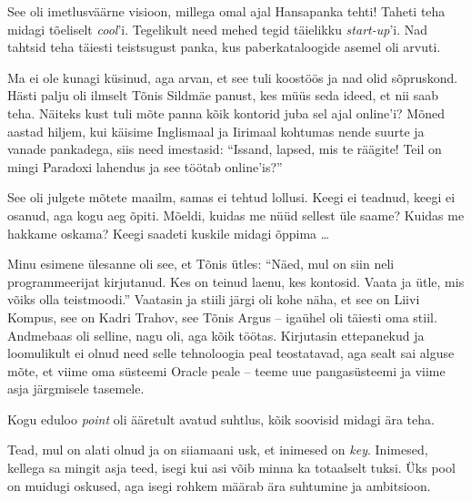 
See oli imetlusväärne visioon, millega omal ajal Hansapanka 
tehti! Taheti teha midagi tõeliselt \emph{cool}'i. Tegelikult need mehed tegid täielikku \emph{start-up}'i. 
Nad tahtsid teha täiesti teistsugust panka, kus paberkataloogide asemel oli 
arvuti. 


Ma ei ole kunagi küsinud, aga arvan, et see tuli koostöös ja nad olid sõpruskond. 
Hästi palju oli ilmselt Tõnis Sildmäe panust, kes
müüs seda ideed, et nii saab teha. Näiteks kust tuli mõte panna kõik kontorid juba sel ajal online'i? 
Mõned aastad hiljem, kui käisime Inglismaal ja Iirimaal kohtumas nende 
suurte ja vanade pankadega, siis need imestasid: \enquote{Issand, lapsed, mis 
te räägite! Teil on mingi Paradoxi lahendus ja see töötab online'is?}

See oli julgete mõtete maailm, samas ei tehtud 
lollusi. Keegi ei teadnud, keegi ei osanud, aga kogu aeg õpiti. Mõeldi, 
kuidas me nüüd sellest üle saame? Kuidas me hakkame oskama? Keegi saadeti
kuskile midagi õppima \dots 

Minu esimene ülesanne oli see, et 
Tõnis ütles: \enquote{Näed, mul on siin neli 
programmeerijat kirjutanud. Kes on teinud laenu, kes kontosid. Vaata 
ja ütle, mis võiks olla teistmoodi.} Vaatasin ja stiili 
järgi oli kohe näha, et see on Liivi Kompus, see on Kadri Trahov, see Tõnis 
Argus -- igaühel oli täiesti oma stiil. Andmebaas oli selline, nagu oli, aga kõik
töötas. Kirjutasin ettepanekud ja loomulikult ei olnud need 
selle tehnoloogia peal teostatavad, aga sealt sai alguse mõte, et viime oma 
süsteemi Oracle peale -- teeme uue pangasüsteemi ja viime asja järgmisele 
tasemele.

Kogu eduloo \emph{point} oli ääretult avatud 
suhtlus, kõik soovisid midagi ära teha. 


Tead, mul on alati olnud ja on siiamaani usk, et inimesed on \emph{key}. Inimesed, kellega sa 
mingit asja teed, isegi kui asi võib minna ka totaalselt 
tuksi. Üks pool on muidugi oskused, aga isegi rohkem 
määrab ära suhtumine ja ambitsioon. 


